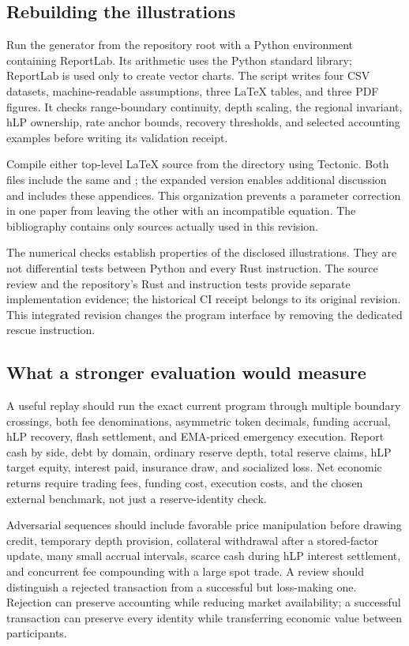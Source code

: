\subsection{Rebuilding the illustrations}

Run the generator from the repository root with a Python environment containing ReportLab. Its arithmetic uses the Python standard library; ReportLab is used only to create vector charts. The script writes four CSV datasets, machine-readable assumptions, three LaTeX tables, and three PDF figures. It checks range-boundary continuity, depth scaling, the regional invariant, hLP ownership, rate anchor bounds, recovery thresholds, and selected accounting examples before writing its validation receipt.

Compile either top-level LaTeX source from the  directory using Tectonic. Both files include the same  and ; the expanded version enables additional discussion and includes these appendices. This organization prevents a parameter correction in one paper from leaving the other with an incompatible equation. The bibliography contains only sources actually used in this revision.

The numerical checks establish properties of the disclosed illustrations. They are not differential tests between Python and every Rust instruction. The source review and the repository's Rust and instruction tests provide separate implementation evidence; the historical CI receipt belongs to its original revision. This integrated revision changes the program interface by removing the dedicated rescue instruction.

\subsection{What a stronger evaluation would measure}

A useful replay should run the exact current program through multiple boundary crossings, both fee denominations, asymmetric token decimals, funding accrual, hLP recovery, flash settlement, and EMA-priced emergency execution. Report cash by side, debt by domain, ordinary reserve depth, total reserve claims, hLP target equity, interest paid, insurance draw, and socialized loss. Net economic returns require trading fees, funding cost, execution costs, and the chosen external benchmark, not just a reserve-identity check.

Adversarial sequences should include favorable price manipulation before drawing credit, temporary depth provision, collateral withdrawal after a stored-factor update, many small accrual intervals, scarce cash during hLP interest settlement, and concurrent fee compounding with a large spot trade. A review should distinguish a rejected transaction from a successful but loss-making one. Rejection can preserve accounting while reducing market availability; a successful transaction can preserve every identity while transferring economic value between participants.

